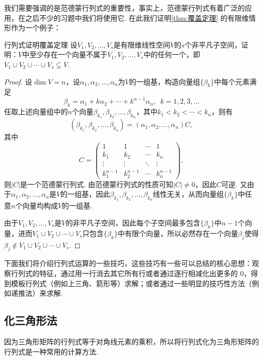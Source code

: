 我们需要强调的是范德蒙行列式的重要性，事实上，范德蒙行列式有着广泛的应用，在之后不少的习题中我们将使用它. 在此我们证明\autoref{thm:覆盖定理} 的有限维情形作为一个例子：
\begin{example}{}{行列式证明覆盖定理}
    设$V_1,V_2,\ldots,V_s$是有限维线性空间$V$的$s$个非平凡子空间，证明：$V$中至少存在一个向量不属于$V_1,V_2,\ldots,V_s$中的任何一个，即$V_1 \cup V_2 \cup \cdots \cup V_s\subsetneq V$.
\end{example}

\begin{proof}
    设$\dim V=n$，设$\alpha_1,\alpha_2,\ldots,\alpha_n$为$V$的一组基，构造向量组$\{\beta_k\}$中每个元素满足
    \[\beta_k=\alpha_1+k\alpha_2+\cdots+k^{n-1}\alpha_n,\enspace k=1,2,3,\ldots\]
    任取上述向量组中的$n$个向量$\beta_{k_1},\beta_{k_2},\ldots,\beta_{k_n}$，其中$k_1<k_2<\cdots<k_n$，则有
    \[(\beta_{k_1},\beta_{k_2},\ldots,\beta_{k_n})=(\alpha_1,\alpha_2,\ldots,\alpha_n)C,\]
    其中
    \[C=\begin{pmatrix}
            1         & 1         & \cdots & 1         \\
            k_1       & k_2       & \cdots & k_n       \\
            \vdots    & \vdots    & \ddots & \vdots    \\
            k_1^{n-1} & k_2^{n-1} & \cdots & k_n^{n-1}
        \end{pmatrix},\]
    则$|C|$是一个范德蒙行列式. 由范德蒙行列式的性质可知$|C| \neq 0$，因此$C$可逆. 又由于$\alpha_1,\alpha_2,\ldots,\alpha_n$是$V$的一组基，因此$\beta_{k_1},\beta_{k_2},\ldots,\beta_{k_n}$线性无关，从而向量组$\{\beta_k\}$中任意$n$个向量均构成$V$的一组基.

    由于$V_1,V_2,\ldots,V_s$是$V$的非平凡子空间，因此每个子空间最多包含$\{\beta_k\}$中$n-1$个向量，进而$V_1\cup V_2\cup\cdots\cup V_s$只包含$\{\beta_k\}$中有限个向量，所以必然存在一个向量$\beta_j$使得$\beta_j \notin V_1\cup V_2\cup\cdots\cup V_s$.
\end{proof}

下面我们将介绍行列式运算的一些技巧，这些技巧有一些可以总结的核心思想：观察行列式的特征，通过用一行消去其它所有行或者通过逐行相减化出更多的 $0$，得到模板行列式（例如上三角、箭形等）求解；或者通过一些明显的技巧性方法（例如递推法）来求解.

\subsection{化三角形法}

因为三角形矩阵的行列式等于对角线元素的乘积，所以将行列式化为三角形矩阵的行列式是一种常用的计算方法.

